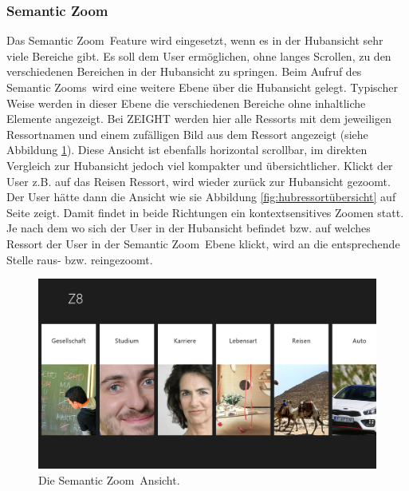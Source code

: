 \documentclass[12pt,a4paper,bibtotoc,abstracton]{scrartcl}
\begin{document}
\subsubsection{Semantic Zoom}
\label{subsubsec:semanticzoom}
Das \glqq Semantic Zoom\grqq\ Feature wird eingesetzt, wenn es in der Hubansicht sehr viele Bereiche gibt. Es soll dem User ermöglichen, ohne langes Scrollen, zu den verschiedenen Bereichen in der Hubansicht zu springen. Beim Aufruf des \glqq Semantic Zooms\grqq\ wird eine weitere Ebene über die Hubansicht gelegt. Typischer Weise werden in dieser Ebene die verschiedenen Bereiche ohne inhaltliche Elemente angezeigt. Bei ZEIGHT werden hier alle Ressorts mit dem jeweiligen Ressortnamen und einem zufälligen Bild aus dem Ressort angezeigt (siehe Abbildung \ref{fig:semanticzoom}). Diese Ansicht ist ebenfalls horizontal scrollbar, im direkten Vergleich zur Hubansicht jedoch viel kompakter und übersichtlicher. Klickt der User z.B. auf das Reisen Ressort, wird wieder zurück zur Hubansicht \glqq gezoomt\grqq. Der User hätte dann die Ansicht wie sie Abbildung \ref{fig:hubressortübersicht} auf Seite \pageref{fig:hubressortübersicht} zeigt. Damit findet in beide Richtungen ein kontextsensitives Zoomen statt. Je nach dem wo sich der User in der Hubansicht befindet bzw. auf welches Ressort der User in der \glqq Semantic Zoom\grqq\ Ebene klickt, wird an die entsprechende Stelle raus- bzw. reingezoomt.  

\begin{figure}[h]
	\centering
	\includegraphics[width=\textwidth]{Bilder/Screenshots/app/reise_aegypten_1zoom.png} 
	\caption[Die Semantic Zoom Ansicht]{Die \glqq Semantic Zoom\grqq\ Ansicht.}
	\label{fig:semanticzoom}
\end{figure}  
\end{document}
